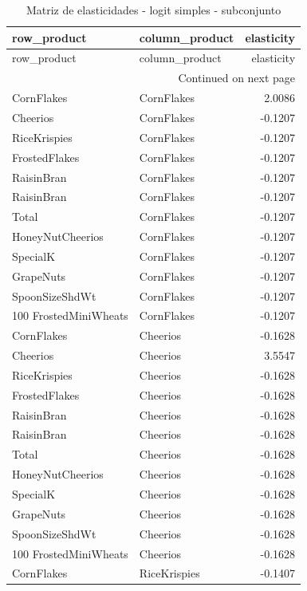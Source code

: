 \scriptsize
\begin{longtable}{llr}
\caption{Matriz de elasticidades - logit simples - subconjunto}\label{tab:elas-simple-subset}\\
\toprule
row_product & column_product & elasticity \\
\midrule
\endfirsthead
\toprule
row_product & column_product & elasticity \\
\midrule
\endhead
\midrule
\multicolumn{3}{r}{Continued on next page} \\
\midrule
\endfoot
\bottomrule
\endlastfoot
CornFlakes & CornFlakes & 2.0086 \\
Cheerios & CornFlakes & -0.1207 \\
RiceKrispies & CornFlakes & -0.1207 \\
FrostedFlakes & CornFlakes & -0.1207 \\
RaisinBran & CornFlakes & -0.1207 \\
RaisinBran & CornFlakes & -0.1207 \\
Total & CornFlakes & -0.1207 \\
HoneyNutCheerios & CornFlakes & -0.1207 \\
SpecialK & CornFlakes & -0.1207 \\
GrapeNuts & CornFlakes & -0.1207 \\
SpoonSizeShdWt & CornFlakes & -0.1207 \\
100%
FrostedMiniWheats & CornFlakes & -0.1207 \\
CornFlakes & Cheerios & -0.1628 \\
Cheerios & Cheerios & 3.5547 \\
RiceKrispies & Cheerios & -0.1628 \\
FrostedFlakes & Cheerios & -0.1628 \\
RaisinBran & Cheerios & -0.1628 \\
RaisinBran & Cheerios & -0.1628 \\
Total & Cheerios & -0.1628 \\
HoneyNutCheerios & Cheerios & -0.1628 \\
SpecialK & Cheerios & -0.1628 \\
GrapeNuts & Cheerios & -0.1628 \\
SpoonSizeShdWt & Cheerios & -0.1628 \\
100%
FrostedMiniWheats & Cheerios & -0.1628 \\
CornFlakes & RiceKrispies & -0.1407 \\

\end{longtable}
